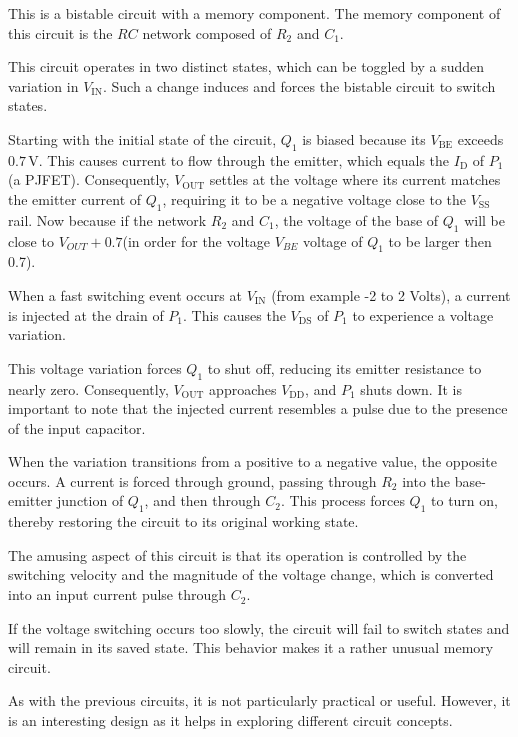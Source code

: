 \documentclass[12pt]{article}
\begin{document}
This is a bistable circuit with a memory component. The memory component of this circuit is the $RC$ network composed of $R_2$ and $C_1$.  

This circuit operates in two distinct states, which can be toggled by a sudden variation in $V_{\text{IN}}$. Such a change induces and forces the bistable circuit to switch states.  

Starting with the initial state of the circuit, $Q_1$ is biased because its $V_{\text{BE}}$ exceeds $0.7 \, \text{V}$. This causes current to flow through the emitter, which equals the $I_{\text{D}}$ of $P_1$ (a PJFET). Consequently, $V_{\text{OUT}}$ settles at the voltage where its current matches the emitter current of $Q_1$, requiring it to be a negative voltage close to the $V_{\text{SS}}$ rail.  Now because if the network $R_2$ and $C_1$, the voltage of the base of $Q_1$ will be close to $V_{OUT} + 0.7$(in order for the voltage $V_{BE}$ voltage of $Q_1$ to be larger then 0.7).

When a fast switching event occurs at $V_{\text{IN}}$ (from example -2 to 2 Volts), a current is injected at the drain of $P_1$. This causes the $V_{\text{DS}}$ of $P_1$ to experience a voltage variation.  

This voltage variation forces $Q_1$ to shut off, reducing its emitter resistance to nearly zero. Consequently, $V_{\text{OUT}}$ approaches $V_{\text{DD}}$, and $P_1$ shuts down. It is important to note that the injected current resembles a pulse due to the presence of the input capacitor.  

When the variation transitions from a positive to a negative value, the opposite occurs. A current is forced through ground, passing through $R_2$ into the base-emitter junction of $Q_1$, and then through $C_2$. This process forces $Q_1$ to turn on, thereby restoring the circuit to its original working state.  


The amusing aspect of this circuit is that its operation is controlled by the switching velocity and the magnitude of the voltage change, which is converted into an input current pulse through $C_2$.  

If the voltage switching occurs too slowly, the circuit will fail to switch states and will remain in its saved state. This behavior makes it a rather unusual memory circuit.  

As with the previous circuits, it is not particularly practical or useful. However, it is an interesting design as it helps in exploring different circuit concepts.
\end{document}
